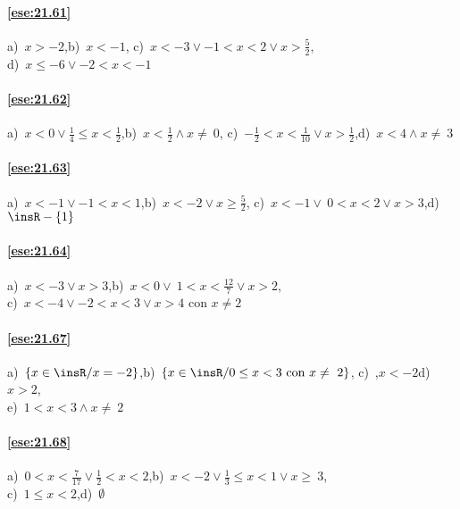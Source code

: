 \paragraph{\ref{ese:21.61}} a)~\(x>-2\),\quad b)~\(x<-1\),\quad
c)~\(x<-3\vee -1<x<2\vee x>\frac{5}{2}\),\quad
\protect\\ d)~\(x\le -6\vee -2<x<-1\)

\paragraph{\ref{ese:21.62}} a)~\(x<0\vee\frac{1}{4}\le x<\frac{1}{2}\),\quad b)~\(x<\frac{1}{2}\wedge x\neq~0\),\quad
c)~\(-\frac{1}{2}<x<\frac{1}{10}\vee x>\frac{1}{2}\),\quad d)~\(x<4\wedge x\neq~3\)

\paragraph{\ref{ese:21.63}} a)~\(x<-1\vee -1<x<1\),\quad b)~\(x<-2\vee x\ge \frac{5}{2}\),\quad
c)~\(x<-1\vee~0<x<2\vee x>3\),\quad d)~\(\insR-\{1\}\)

\paragraph{\ref{ese:21.64}} a)~\(x<-3\vee x>3\),\quad b)~\(x<0\vee~1<x<\frac{12}{7}\vee x>2\),\quad
\protect\\ c)~\(x<-4\vee -2<x<3\vee x>4\text{ con }x\neq2\)

\paragraph{\ref{ese:21.67}} a)~\(\left\{x\in\insR/x=-2\right\}\),\quad b)~\(\left\{x\in \insR/0\le x<3\text{ con }x\neq~2\right\}\),\quad
c)~,\(x<-2\)\quad d)~\(x>2\),\quad
\protect\\ e)~\(1<x<3\wedge x\neq~2\)

\paragraph{\ref{ese:21.68}} a)~\(0<x<\frac{7}{17}\vee\frac{1}{2}<x<2\),\quad b)~\(x<-2\vee \frac{1}{3}\le x<1\vee x\ge~3\),\quad
\protect\\ c)~\(1\le x<2\),\quad d)~\(\emptyset \)
